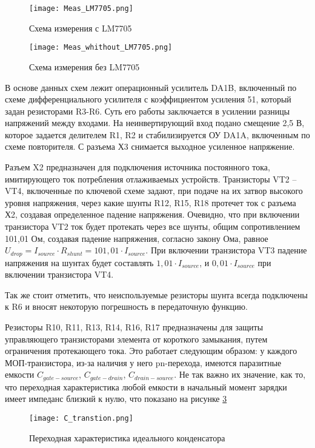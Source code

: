 \begin{figure}[H]
\centering
\texttt{[image: Meas\_LM7705.png]}
\caption{Схема измерения с LM7705}
\label{ris:428}
\end{figure}


\begin{figure}[H]
\centering
\texttt{[image: Meas\_whithout\_LM7705.png]}
\caption{Схема измерения без LM7705}
\label{ris:429}
\end{figure}

В основе данных схем лежит операционный усилитель DA1B, включенный по схеме дифференциального усилителя с 
коэффициентом усиления 51, который задан резисторами R3-R6. Суть его работы заключается в усилении разницы 
напряжений между входами. На неинвертирующий вход подано смещение 2,5 В, которое задается делителем R1, R2 и 
стабилизируется ОУ DA1A, включенным по схеме повторителя. С разъема Х3 снимается выходное усиленное напряжение. 

Разъем X2 предназначен для подключения источника постоянного тока, имитирующего ток потребления отлаживаемых устройств. 
Транзисторы VT2 -- VT4, включенные по ключевой схеме задают, при подаче на их затвор высокого уровня напряжения,
через какие шунты R12, R15, R18 протечет ток с разъема Х2, создавая определенное падение напряжения. 
Очевидно, что при включении транзистора VT2 ток будет протекать через
все шунты, общим сопротивлением 101,01 Ом, создавая падение напряжения, согласно закону Ома, равное 
$U_{drop} = I_{source} \cdot R_{shunt} = 101,01 \cdot I_{source}$. При включении транзистора VT3 падение напряжения
на шунтах будет составлять $1,01 \cdot I_{source}$, и $0,01 \cdot I_{source}$ при включении транзистора VT4.

Так же стоит отметить, что неиспользуемые резисторы шунта всегда подключены к R6 и вносят некоторую погрешность в 
передаточную функцию. 

Резисторы R10, R11, R13, R14, R16, R17 предназначены для защиты управляющего транзисторами элемента от короткого
замыкания, путем ограничения протекающего тока. Это работает следующим образом: у каждого МОП-транзистора, 
из-за наличия у него pn-перехода, имеются
паразитные емкости $C_{gate-source}$, $C_{gate-drain}$, $C_{drain-source}$. Не так важно их значение, как то, что
переходная характеристика любой емкости в начальный момент зарядки имеет импеданс близкий к нулю, что 
показано на рисунке \ref{ris:430}

\begin{figure}[H]
\centering
\texttt{[image: C\_transtion.png]}
\caption{Переходная характеристика идеального конденсатора}
\label{ris:430}
\end{figure}

